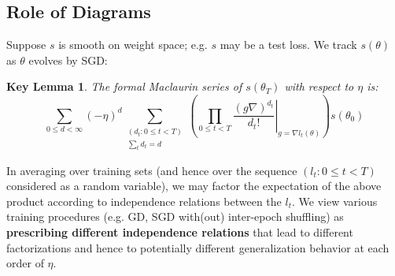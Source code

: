 \documentclass{article}
\newtheorem{klem}{Key Lemma}
\begin{document}
\subsection{Role of Diagrams}
    Suppose $s$ is smooth on weight space; e.g. $s$ may be a test
    loss.  We track $s(\theta)$ as $\theta$ evolves by SGD:
    \begin{klem}
        The formal Maclaurin series of $s(\theta_T)$ with respect to $\eta$ is:
        \begin{equation*}\label{eq:dyson}
            \sum_{0\leq d < \infty} (-\eta)^d \sum_{\substack{(d_t: 0\leq t<T) \\ \sum_t d_t = d}}
            \left(
                \prod_{0 \leq t < T}
                    \left.  \frac{(g \nabla)^{d_t}}{d_t!} \right|_{g=\nabla l_t(\theta)}
            \right)
            s (\theta_0)
        \end{equation*}
    \end{klem}
    In averaging over training sets (and hence over the sequence $(l_t: 0\leq
    t<T)$ considered as a random variable), we may factor the expectation of
    the above product according to independence relations between the $l_t$.
    We view various training procedures (e.g. GD, SGD with(out) inter-epoch
    shuffling) as {\bf prescribing different independence relations} that lead
    to different factorizations and hence to potentially different
    generalization behavior at each order of $\eta$.
\end{document}
